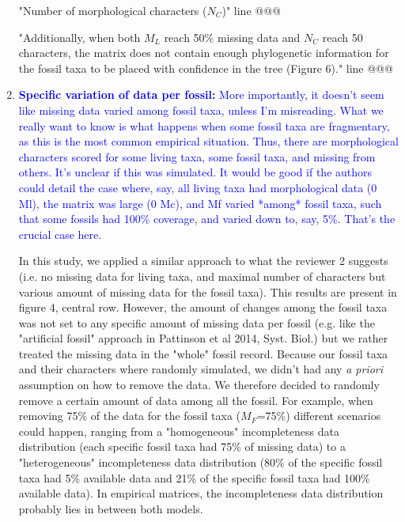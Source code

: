 \documentclass[12pt,letterpaper]{article}
\begin{document}
\begin{enumerate}
"Number of morphological characters ($N_{C}$)" line @@@ %

"Additionally, when both $M_{L}$ reach 50\% missing data and $N_{C}$ reach 50 characters, the matrix does not contain enough phylogenetic information for the fossil taxa to be placed with confidence in the tree (Figure 6)." line @@@

\item{\textcolor{blue}{\textbf{Specific variation of data per fossil:} More importantly, it doesn't seem like missing data varied among fossil taxa, unless I'm misreading. What we really want to know is what happens when some fossil taxa are fragmentary, as this is the most common empirical situation. Thus, there are morphological characters scored for some living taxa, some fossil taxa, and missing from others. It's unclear if this was simulated. It would be good if the authors could detail the case where, say, all living taxa had morphological data (0 Ml), the matrix was large (0 Mc), and Mf varied *among* fossil taxa, such that some fossils had 100\% coverage, and varied down to, say, 5\%. That's the crucial case here.}}

In this study, we applied a similar approach to what the reviewer 2 suggests (i.e. no missing data for living taxa, and maximal number of characters but various amount of missing data for the fossil taxa).
This results are present in figure 4, central row.
However, the amount of changes among the fossil taxa was not set to any specific amount of missing data per fossil (e.g. like the "artificial fossil" approach in Pattinson et al 2014, Syst. Biol.) but we rather treated the missing data in the "whole" fossil record.
Because our fossil taxa and their characters where randomly simulated, we didn't had any \textit{a priori} assumption on how to remove the data.
We therefore decided to randomly remove a certain amount of data among all the fossil.
For example, when removing 75\% of the data for the fossil taxa ($M_F$=75\%) different scenarios could happen, ranging from a "homogeneous" incompleteness data distribution (each specific fossil taxa had 75\% of missing data) to a "heterogeneous" incompleteness data distribution  (80\% of the specific fossil taxa had 5\% available data and 21\% of the specific fossil taxa had 100\% available data).
In empirical matrices, the incompleteness data distribution probably lies in between both models.


\end{enumerate}
\end{document}
